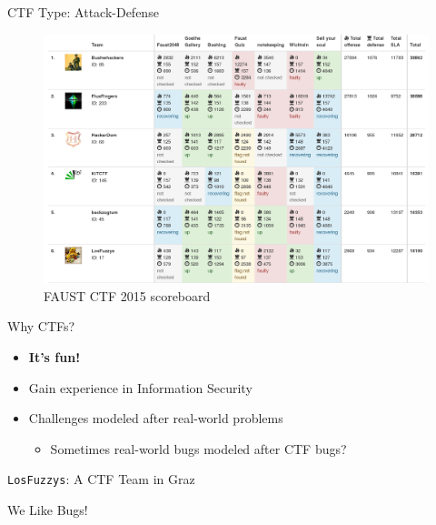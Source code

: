 \begin{frame}
  {CTF Type: Attack-Defense}

  \begin{figure}[h]
    \centering
    \includegraphics[width=\textwidth]{../images/faustctf-scoreboard.png}
    \caption{\footnotesize{}FAUST CTF 2015 scoreboard}
    \label{fig:faustctfscoreboard}
  \end{figure}

\end{frame}


\begin{frame}
  {Why CTFs?}

  \begin{itemize}
    \item \textbf{It's fun!}
    \item Gain experience in Information Security
    \item Challenges modeled after real-world problems
      \begin{itemize}
        \item Sometimes real-world bugs modeled after CTF bugs?
      \end{itemize}
  \end{itemize}
\end{frame}


{
\begin{frame}

  {\huge
    \texttt{LosFuzzys}: A CTF Team in Graz}

  \vspace{19em}

  {\Large
  We Like Bugs!}

\end{frame}
}

